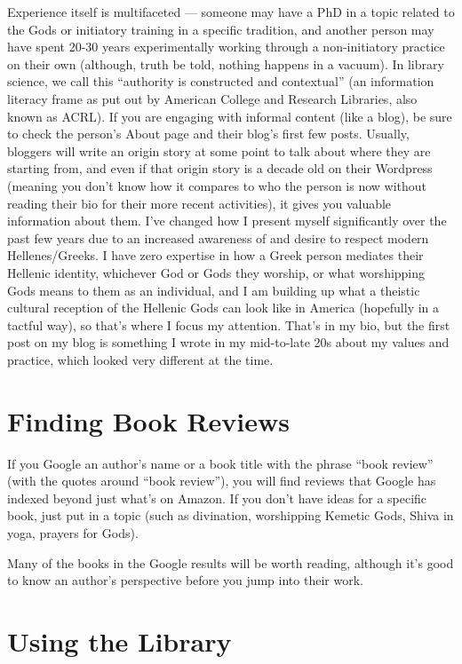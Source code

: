 \documentclass[
]{book}
\begin{document}
Experience itself is multifaceted --- someone may have a PhD in a topic related to the Gods or initiatory training in a specific tradition, and another person may have spent 20-30 years experimentally working through a non-initiatory practice on their own (although, truth be told, nothing happens in a vacuum). In library science, we call this ``authority is constructed and contextual'' (an information literacy frame as put out by American College and Research Libraries, also known as ACRL). If you are engaging with informal content (like a blog), be sure to check the person's About page and their blog's first few posts. Usually, bloggers will write an origin story at some point to talk about where they are starting from, and even if that origin story is a decade old on their Wordpress (meaning you don't know how it compares to who the person is now without reading their bio for their more recent activities), it gives you valuable information about them. I've changed how I present myself significantly over the past few years due to an increased awareness of and desire to respect modern Hellenes/Greeks. I have zero expertise in how a Greek person mediates their Hellenic identity, whichever God or Gods they worship, or what worshipping Gods means to them as an individual, and I am building up what a theistic cultural reception of the Hellenic Gods can look like in America (hopefully in a tactful way), so that's where I focus my attention. That's in my bio, but the first post on my blog is something I wrote in my mid-to-late 20s about my values and practice, which looked very different at the time.

\hypertarget{finding-book-reviews}{%
\section{Finding Book Reviews}\label{finding-book-reviews}}

If you Google an author's name or a book title with the phrase ``book review'' (with the quotes around ``book review''), you will find reviews that Google has indexed beyond just what's on Amazon. If you don't have ideas for a specific book, just put in a topic (such as divination, worshipping Kemetic Gods, Shiva in yoga, prayers for Gods).

Many of the books in the Google results will be worth reading, although it's good to know an author's perspective before you jump into their work.

\hypertarget{using-the-library}{%
\section{Using the Library}\label{using-the-library}}
\end{document}
